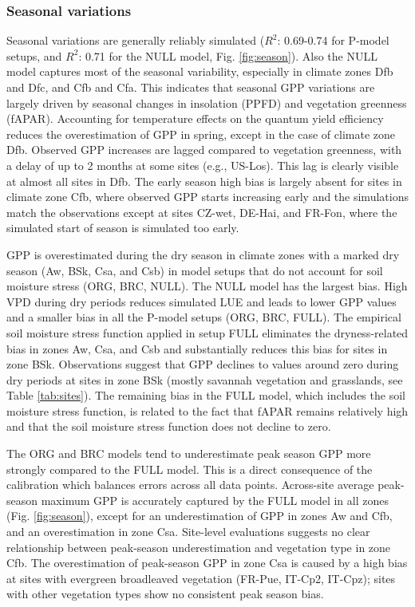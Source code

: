 \documentclass[gmd, manuscript]{copernicus}
\newcommand{\rsq}{$R^2$}
\begin{document}
\subsubsection{Seasonal variations}
\label{sec:results_seasonal}
Seasonal variations are generally reliably simulated (\rsq : 0.69-0.74 for P-model setups, and \rsq : 0.71 for the NULL model, Fig. \ref{fig:season}). Also the NULL model captures most of the seasonal variability, especially in climate zones Dfb and Dfc, and Cfb and Cfa. This indicates that seasonal GPP variations are largely driven by seasonal changes in insolation (PPFD) and vegetation greenness (fAPAR). Accounting for temperature effects on the quantum yield efficiency reduces the overestimation of GPP in spring, except in the case of climate zone Dfb. Observed GPP increases are lagged compared to vegetation greenness, with a delay of up to 2 months at some sites (e.g., US-Los). This lag is clearly visible at almost all sites in Dfb. The early season high bias is largely absent for sites in climate zone Cfb, where observed GPP starts increasing early and the simulations match the observations except at sites CZ-wet, DE-Hai, and FR-Fon, where the simulated start of season is simulated too early.

GPP is overestimated during the dry season in climate zones with a marked dry season (Aw, BSk, Csa, and Csb) in model setups that do not account for soil moisture stress (ORG, BRC, NULL). The NULL model has the largest bias. High VPD during dry periods reduces simulated LUE and leads to lower GPP values and a smaller bias in all the P-model setups (ORG, BRC, FULL). The empirical soil moisture stress function applied in setup FULL eliminates the dryness-related bias in zones Aw, Csa, and Csb and substantially reduces this bias for sites in zone BSk. Observations suggest that GPP declines to values around zero during dry periods at sites in zone BSk (mostly savannah vegetation and grasslands, see Table \ref{tab:sites}). The remaining bias in the FULL model, which includes the soil moisture stress function, is related to the fact that fAPAR remains relatively high and that the soil moisture stress function does not decline to zero.

The ORG and BRC models tend to underestimate peak season GPP more strongly compared to the FULL model. This is a direct consequence of the calibration which balances errors across all data points. Across-site average peak-season maximum GPP is accurately captured by the FULL model in all zones (Fig. \ref{fig:season}), except for an underestimation of GPP in zones Aw and Cfb, and an overestimation in zone Csa. Site-level evaluations suggests no clear relationship between peak-season underestimation and vegetation type in zone Cfb. The overestimation of peak-season GPP in zone Csa is caused by a high bias at sites with evergreen broadleaved vegetation (FR-Pue, IT-Cp2, IT-Cpz); sites with other vegetation types show no consistent peak season bias. 
\end{document}
